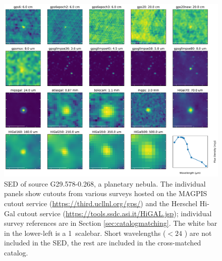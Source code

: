 \documentclass[twocolumn]{aastex62}
\def\todo#1{{\textcolor{red}{TODO: #1}}}
\begin{document}


\begin{figure}[htp]
\includegraphics[width=17cm]{figures/SED_plot_G29_G29.578-0.268.pdf}
\caption{SED of source G29.578-0.268, a planetary nebula.  The individual panels show cutouts from 
various surveys hosted on the MAGPIS cutout service
(\url{https://third.ucllnl.org/gps/}) and the Herschel Hi-Gal cutout service
(\url{https://tools.ssdc.asi.it/HiGAL.jsp}); individual survey references are in Section \ref{sec:catalogmatching}.
The white bar in the lower-left is a 1\arcmin\ scalebar.
Short wavelengths ($<24$ \um) are not included in the SED, the rest are included in the cross-matched catalog.
}
\label{fig:g29pn}
\end{figure}
\end{document}
